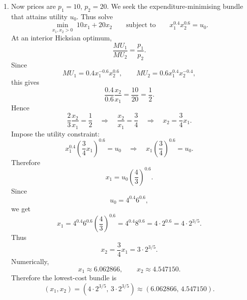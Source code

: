 \documentclass[12pt]{article}
\begin{document}
\begin{enumerate}[label=(\alph*)]
    \item
    Now prices are \(p_1=10\), \(p_2=20\). We seek the expenditure-minimising bundle that attains utility \(u_0\). Thus solve
    \[
    \min_{x_1,x_2>0}\;10x_1+20x_2
    \qquad\text{subject to}\qquad
    x_1^{0.4}x_2^{0.6}=u_0.
    \]
    At an interior Hicksian optimum,
    \[
    \frac{MU_1}{MU_2}=\frac{p_1}{p_2}.
    \]
    Since
    \[
    MU_1=0.4x_1^{-0.6}x_2^{0.6},
    \qquad
    MU_2=0.6x_1^{0.4}x_2^{-0.4},
    \]
    this gives
    \[
    \frac{0.4}{0.6}\frac{x_2}{x_1}=\frac{10}{20}=\frac12.
    \]
    Hence
    \[
    \frac{2}{3}\frac{x_2}{x_1}=\frac12
    \quad\Longrightarrow\quad
    \frac{x_2}{x_1}=\frac34
    \quad\Longrightarrow\quad
    x_2=\frac34x_1.
    \]
    Impose the utility constraint:
    \[
    x_1^{0.4}\left(\frac34x_1\right)^{0.6}=u_0
    \quad\Longrightarrow\quad
    x_1\left(\frac34\right)^{0.6}=u_0.
    \]
    Therefore
    \[
    x_1=u_0\left(\frac43\right)^{0.6}.
    \]
    Since
    \[
    u_0=4^{0.4}6^{0.6},
    \]
    we get
    \[
    x_1
    =
    4^{0.4}6^{0.6}\left(\frac43\right)^{0.6}
    =
    4^{0.4}8^{0.6}
    =
    4\cdot 2^{0.6}
    =
    4\cdot 2^{3/5}.
    \]
    Thus
    \[
    x_2=\frac34x_1=3\cdot 2^{3/5}.
    \]
    Numerically,
    \[
    x_1\approx 6.062866,
    \qquad
    x_2\approx 4.547150.
    \]
    Therefore the lowest-cost bundle is
    \[
    \boxed{\left(x_1,x_2\right)=\left(4\cdot 2^{3/5},\,3\cdot 2^{3/5}\right)\approx(6.062866,\,4.547150).}
    \]
\end{enumerate}

\newpage
\end{document}
